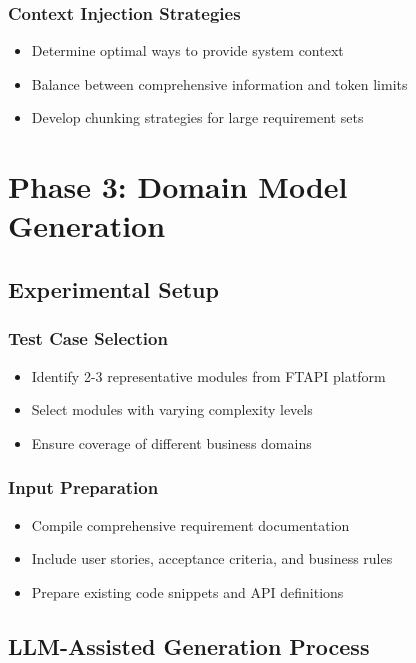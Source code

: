 \subsubsection{Context Injection Strategies}
\begin{itemize}
    \item Determine optimal ways to provide system context
    \item Balance between comprehensive information and token limits
    \item Develop chunking strategies for large requirement sets
\end{itemize}

\section{Phase 3: Domain Model Generation}

\subsection{Experimental Setup}
\subsubsection{Test Case Selection}
\begin{itemize}
    \item Identify 2-3 representative modules from FTAPI platform
    \item Select modules with varying complexity levels
    \item Ensure coverage of different business domains
\end{itemize}

\subsubsection{Input Preparation}
\begin{itemize}
    \item Compile comprehensive requirement documentation
    \item Include user stories, acceptance criteria, and business rules
    \item Prepare existing code snippets and API definitions
\end{itemize}

\subsection{LLM-Assisted Generation Process}

